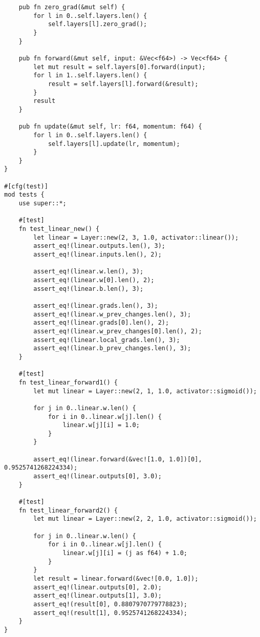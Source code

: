 \begin{code}
\begin{verbatim}
    pub fn zero_grad(&mut self) {
        for l in 0..self.layers.len() {
            self.layers[l].zero_grad();
        }
    }

    pub fn forward(&mut self, input: &Vec<f64>) -> Vec<f64> {
        let mut result = self.layers[0].forward(input);
        for l in 1..self.layers.len() {
            result = self.layers[l].forward(&result);
        }
        result
    }

    pub fn update(&mut self, lr: f64, momentum: f64) {
        for l in 0..self.layers.len() {
            self.layers[l].update(lr, momentum);
        }
    }
}

#[cfg(test)]
mod tests {
    use super::*;

    #[test]
    fn test_linear_new() {
        let linear = Layer::new(2, 3, 1.0, activator::linear());
        assert_eq!(linear.outputs.len(), 3);
        assert_eq!(linear.inputs.len(), 2);

        assert_eq!(linear.w.len(), 3);
        assert_eq!(linear.w[0].len(), 2);
        assert_eq!(linear.b.len(), 3);

        assert_eq!(linear.grads.len(), 3);
        assert_eq!(linear.w_prev_changes.len(), 3);
        assert_eq!(linear.grads[0].len(), 2);
        assert_eq!(linear.w_prev_changes[0].len(), 2);
        assert_eq!(linear.local_grads.len(), 3);
        assert_eq!(linear.b_prev_changes.len(), 3);
    }

    #[test]
    fn test_linear_forward1() {
        let mut linear = Layer::new(2, 1, 1.0, activator::sigmoid());

        for j in 0..linear.w.len() {
            for i in 0..linear.w[j].len() {
                linear.w[j][i] = 1.0;
            }
        }

        assert_eq!(linear.forward(&vec![1.0, 1.0])[0], 0.9525741268224334);
        assert_eq!(linear.outputs[0], 3.0);
    }

    #[test]
    fn test_linear_forward2() {
        let mut linear = Layer::new(2, 2, 1.0, activator::sigmoid());

        for j in 0..linear.w.len() {
            for i in 0..linear.w[j].len() {
                linear.w[j][i] = (j as f64) + 1.0;
            }
        }
        let result = linear.forward(&vec![0.0, 1.0]);
        assert_eq!(linear.outputs[0], 2.0);
        assert_eq!(linear.outputs[1], 3.0);
        assert_eq!(result[0], 0.8807970779778823);
        assert_eq!(result[1], 0.9525741268224334);
    }
}
\end{verbatim}
\end{code}

